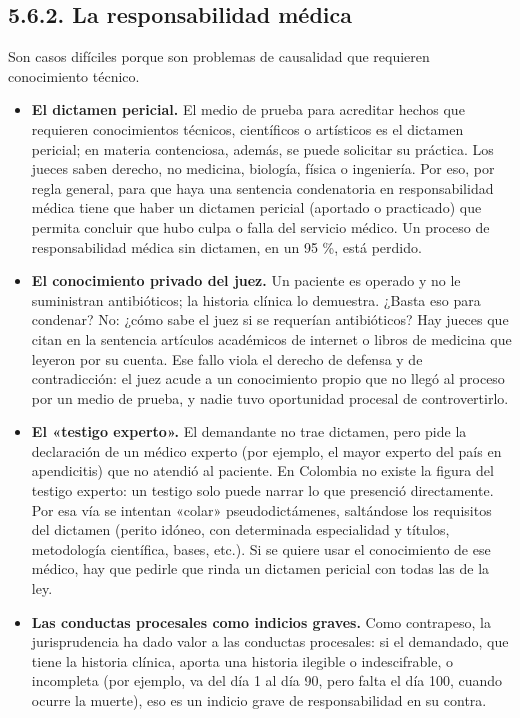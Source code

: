 \subsection{5.6.2. La responsabilidad médica}
Son casos difíciles porque son problemas de causalidad que requieren conocimiento técnico.

\begin{itemize}
\item \textbf{El dictamen pericial.} El medio de prueba para acreditar hechos que requieren conocimientos técnicos, científicos o artísticos es el dictamen pericial; en materia contenciosa, además, se puede solicitar su práctica. Los jueces saben derecho, no medicina, biología, física o ingeniería. Por eso, por regla general, para que haya una sentencia condenatoria en responsabilidad médica tiene que haber un dictamen pericial (aportado o practicado) que permita concluir que hubo culpa o falla del servicio médico. Un proceso de responsabilidad médica sin dictamen, en un 95 \%, está perdido.
\item \textbf{El conocimiento privado del juez.} Un paciente es operado y no le suministran antibióticos; la historia clínica lo demuestra. ¿Basta eso para condenar? No: ¿cómo sabe el juez si se requerían antibióticos? Hay jueces que citan en la sentencia artículos académicos de internet o libros de medicina que leyeron por su cuenta. Ese fallo viola el derecho de defensa y de contradicción: el juez acude a un conocimiento propio que no llegó al proceso por un medio de prueba, y nadie tuvo oportunidad procesal de controvertirlo.
\item \textbf{El «testigo experto».} El demandante no trae dictamen, pero pide la declaración de un médico experto (por ejemplo, el mayor experto del país en apendicitis) que no atendió al paciente. En Colombia no existe la figura del testigo experto: un testigo solo puede narrar lo que presenció directamente. Por esa vía se intentan «colar» pseudodictámenes, saltándose los requisitos del dictamen (perito idóneo, con determinada especialidad y títulos, metodología científica, bases, etc.). Si se quiere usar el conocimiento de ese médico, hay que pedirle que rinda un dictamen pericial con todas las de la ley.
\item \textbf{Las conductas procesales como indicios graves.} Como contrapeso, la jurisprudencia ha dado valor a las conductas procesales: si el demandado, que tiene la historia clínica, aporta una historia ilegible o indescifrable, o incompleta (por ejemplo, va del día 1 al día 90, pero falta el día 100, cuando ocurre la muerte), eso es un indicio grave de responsabilidad en su contra.
\end{itemize}
